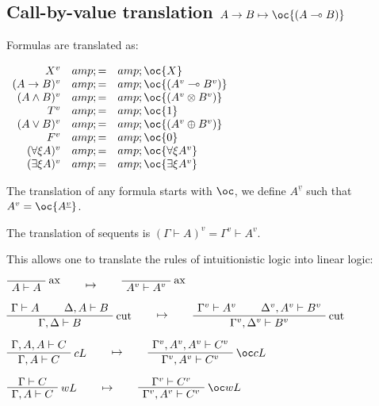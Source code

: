 \subsection{\texorpdfstring{Call-by-value translation
\(A\imp B \mapsto \oc{(A\limp B)}\)}{Call-by-value translation A\textbackslash{}imp B \textbackslash{}mapsto \textbackslash{}oc\{(A\textbackslash{}limp B)\}}}\label{call-by-value-translation-aimp-b-mapsto-ocalimp-b}

Formulas are translated as:

\(\begin{array}{rcl}
X^v &amp; = &amp; \oc{X} \\
(A\imp B)^v &amp; = &amp; \oc{(A^v\limp B^v)} \\
(A\wedge B)^v &amp; = &amp; \oc{(A^v \tens B^v)} \\
T^v &amp; = &amp; \oc{\one} \\
(A\vee B)^v &amp; = &amp; \oc{(A^v\plus B^v)} \\
F^v &amp; = &amp; \oc{\zero} \\
(\forall\xi A)^v &amp; = &amp; \oc{\forall\xi A^v} \\
(\exists\xi A)^v &amp; = &amp; \oc{\exists\xi A^v}
\end{array}\)

The translation of any formula starts with \(\oc\), we define
\(A^{\underline{v}}\) such that \(A^v=\oc{A^{\underline{v}}}\).

The translation of sequents is
\((\Gamma\vdash A)^v = \Gamma^v\vdash A^v\).

This allows one to translate the rules of intuitionistic logic into
linear logic:

\(\LabelRule{\rulename{ax}}
\NulRule{A\vdash A}
\DisplayProof
\qquad\mapsto\qquad
\LabelRule{\rulename{ax}}
\NulRule{A^v\vdash A^v}
\DisplayProof\)

\(\AxRule{\Gamma\vdash A}
\AxRule{\Delta,A\vdash B}
\LabelRule{\rulename{cut}}
\BinRule{\Gamma,\Delta\vdash B}
\DisplayProof
\qquad\mapsto\qquad
\AxRule{\Gamma^v\vdash A^v}
\AxRule{\Delta^v,A^v\vdash B^v}
\LabelRule{\rulename{cut}}
\BinRule{\Gamma^v,\Delta^v\vdash B^v}
\DisplayProof\)

\(\AxRule{\Gamma,A,A\vdash C}
\LabelRule{c L}
\UnaRule{\Gamma,A\vdash C}
\DisplayProof
\qquad\mapsto\qquad
\AxRule{\Gamma^v,A^v,A^v\vdash C^v}
\LabelRule{\oc c L}
\UnaRule{\Gamma^v,A^v\vdash C^v}
\DisplayProof\)

\(\AxRule{\Gamma\vdash C}
\LabelRule{w L}
\UnaRule{\Gamma,A\vdash C}
\DisplayProof
\qquad\mapsto\qquad
\AxRule{\Gamma^v\vdash C^v}
\LabelRule{\oc w L}
\UnaRule{\Gamma^v,A^v\vdash C^v}
\DisplayProof\)

